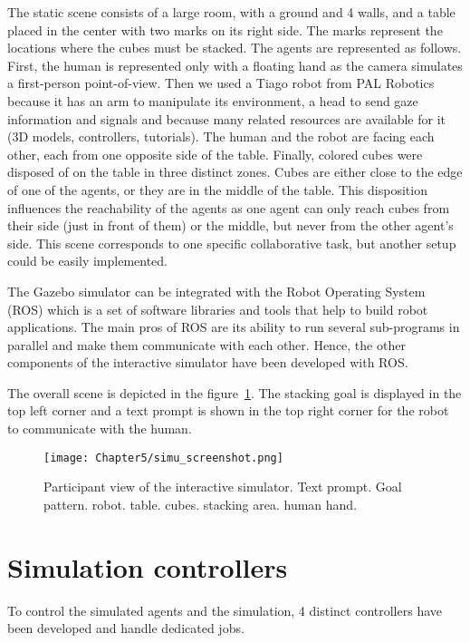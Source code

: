 The static scene consists of a large room, with a ground and 4 walls, and a table placed in the center with two marks on its right side. The marks represent the locations where the cubes must be stacked. The agents are represented as follows. First, the human is represented only with a floating hand as the camera simulates a first-person point-of-view. Then we used a Tiago robot from PAL Robotics because it has an arm to manipulate its environment, a head to send gaze information and signals and because many related resources are available for it (3D models, controllers, tutorials). The human and the robot are facing each other, each from one opposite side of the table. Finally, colored cubes were disposed of on the table in three distinct zones. Cubes are either close to the edge of one of the agents, or they are in the middle of the table. This disposition influences the reachability of the agents as one agent can only reach cubes from their side (just in front of them) or the middle, but never from the other agent's side. This scene corresponds to one specific collaborative task, but another setup could be easily implemented. 

The Gazebo simulator can be integrated with the Robot Operating System (ROS) which is a set of software libraries and tools that help to build robot applications. The main pros of ROS are its ability to run several sub-programs in parallel and make them communicate with each other. Hence, the other components of the interactive simulator have been developed with ROS.

The overall scene is depicted in the figure~\ref{fig:simu_view}. The stacking goal is displayed in the top left corner and a text prompt is shown in the top right corner for the robot to communicate with the human.

\begin{figure}[h]
    \centering
    \texttt{[image: Chapter5/simu\_screenshot.png]}
    \caption{Participant view of the interactive simulator. Text prompt. Goal pattern. robot. table. cubes. stacking area. human hand.}
    \label{fig:simu_view}
\end{figure}

\section{Simulation controllers}

To control the simulated agents and the simulation, 4 distinct controllers have been developed and handle dedicated jobs. 

